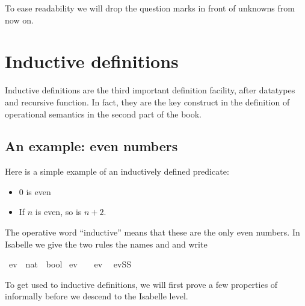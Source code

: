 \begin{isabellebody}
\begin{isamarkuptext}
\begin{warn}
To ease readability we will drop the question marks
in front of unknowns from now on.
\end{warn}


\section{Inductive definitions}
\label{sec:inductive-defs}

Inductive definitions are the third important definition facility, after
datatypes and recursive function.
\sem
In fact, they are the key construct in the
definition of operational semantics in the second part of the book.
\endsem

\subsection{An example: even numbers}
\label{sec:Logic:even}

Here is a simple example of an inductively defined predicate:
\begin{itemize}
\item 0 is even
\item If $n$ is even, so is $n+2$.
\end{itemize}
The operative word ``inductive'' means that these are the only even numbers.
In Isabelle we give the two rules the names  and 
and write%
\end{isamarkuptext}%
\isamarkuptrue%
\isamarkupfalse%
\ ev\ {}{}\ {}nat\ {}\ bool{}\ \isanewline
ev{}{}\ \ \ \ {}ev\ {}{}\ {}\isanewline
evSS{}\ \ %
%
\begin{isamarkuptext}%
To get used to inductive definitions, we will first prove a few
properties of  informally before we descend to the Isabelle level.


\end{isamarkuptext}
\end{isabellebody}
